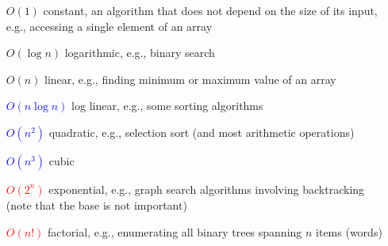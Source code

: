 \begin{itemize}[nosep,labelindent=1em,labelwidth=1.3cm,labelsep*=1em,leftmargin =!]
  \item[\textcolor{blue!50!green}{$O(1)$}] constant,
    an algorithm that does not depend on the size of its input,
    e.g., accessing a single element of an array
  \item[\textcolor{blue!50!green}{$O(\log n)$}] logarithmic,
    e.g., binary search
  \item[\textcolor{blue!50!green}{$O(n)$}] linear,
    e.g., finding minimum or maximum value of an array
  \item[\textcolor{blue}{$O(n \log n)$}] log linear,
    e.g., some sorting algorithms 
  \item[\textcolor{blue}{$O(n^{2})$}] quadratic,
    e.g., selection sort (and most arithmetic operations)
  \item[\textcolor{blue}{$O(n^{3})$}] cubic
  \item[\textcolor{red}{$O(2^{n})$}] exponential,
    e.g., graph search algorithms involving backtracking
    (note that the base is not important)
  \item[\textcolor{red}{$O(n!)$}] factorial,
    e.g., enumerating all binary trees spanning $n$ items (words)
\end{itemize}

